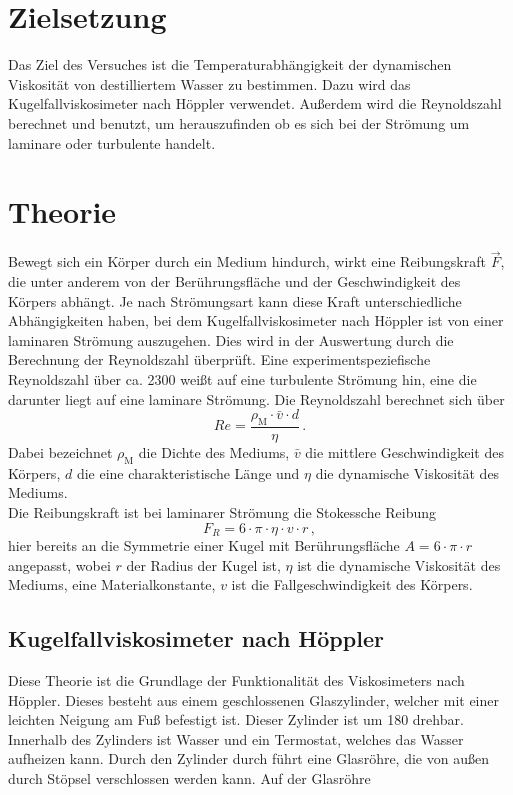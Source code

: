 \section{Zielsetzung}
\label{sec:Zielsetzung}
Das Ziel des Versuches ist die Temperaturabhängigkeit der dynamischen 
Viskosität von destilliertem Wasser zu bestimmen. Dazu wird das 
Kugelfallviskosimeter nach Höppler verwendet. Außerdem wird die Reynoldszahl 
berechnet und benutzt, um herauszufinden ob es sich bei der Strömung um 
laminare oder turbulente handelt. 
%
%
%
\section{Theorie}
\label{sec:Theorie}
Bewegt sich ein Körper durch ein Medium hindurch, wirkt eine Reibungskraft 
$\vec{F}$, die unter anderem von der Berührungsfläche und der Geschwindigkeit
des Körpers abhängt. Je nach Strömungsart kann diese Kraft 
unterschiedliche Abhängigkeiten haben, bei dem Kugelfallviskosimeter nach 
Höppler ist von einer laminaren Strömung auszugehen. 
Dies wird in der Auswertung durch die
Berechnung der Reynoldszahl überprüft. Eine experimentspeziefische 
Reynoldszahl über ca. 2300 weißt auf eine turbulente Strömung hin, eine die
darunter liegt auf eine laminare Strömung. Die Reynoldszahl berechnet sich
über 
\begin{equation}
    Re = \frac{\rho_{\text{M}} \cdot \bar{v} \cdot d}{\eta}\,. 
    \label{equ:Reynoldszahl}
\end{equation}
Dabei bezeichnet $\rho_{\text{M}}$ die Dichte des Mediums, $\bar{v}$
die mittlere Geschwindigkeit des Körpers, $d$ die eine charakteristische 
Länge und $\eta$ die dynamische Viskosität des Mediums. \\
Die Reibungskraft ist bei laminarer Strömung die Stokessche Reibung
\begin{equation}
    F_{R} = 6 \cdot \pi \cdot \eta \cdot v \cdot r \, , 
    \label{equ:Stokesreibungskraft}
\end{equation}
hier bereits an die Symmetrie einer Kugel mit Berührungsfläche 
$A = 6 \cdot \pi \cdot r$ angepasst, wobei $r$ der Radius der Kugel ist, 
$\eta$ ist die dynamische Viskosität des Mediums, eine Materialkonstante,
$v$ ist die Fallgeschwindigkeit des Körpers. \\
%
%
%
\subsection{Kugelfallviskosimeter nach Höppler}
Diese Theorie ist die Grundlage der Funktionalität des Viskosimeters 
nach Höppler. Dieses besteht aus einem geschlossenen Glaszylinder, 
welcher mit einer leichten Neigung am Fuß befestigt
ist. Dieser Zylinder ist um 180 \degree drehbar. Innerhalb des 
Zylinders ist Wasser und ein Termostat, welches das Wasser aufheizen kann.
Durch den Zylinder durch führt eine Glasröhre, die von außen durch Stöpsel 
verschlossen werden kann. Auf der Glasröhre  
%
%
%
